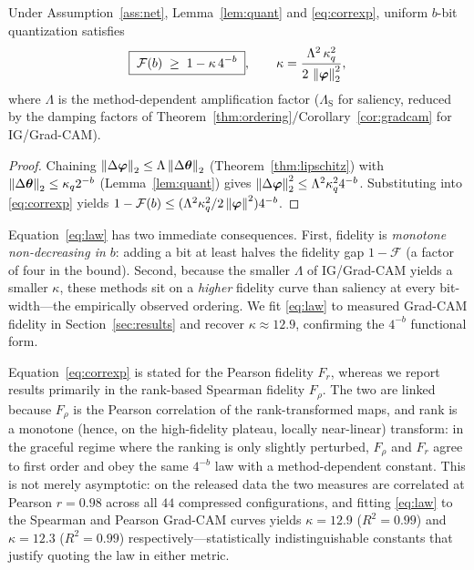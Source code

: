 \begin{theorem}
\label{thm:law}
Under Assumption~\ref{ass:net}, Lemma~\ref{lem:quant} and \eqref{eq:correxp},
uniform $b$-bit quantization satisfies
\begin{equation}
\boxed{\;\mathcal F(b)\;\ge\;1-\kappa\,4^{-b}\;},\qquad
\kappa=\frac{\Lambda^2\,\kappa_q^2}{2\,\left\lVert\bm{\varphi}\right\rVert_2^2},
\label{eq:law}
\end{equation}
where $\Lambda$ is the method-dependent amplification factor
($\Lambda_{\mathrm S}$ for saliency, reduced by the damping factors of
Theorem~\ref{thm:ordering}/Corollary~\ref{cor:gradcam} for IG/Grad-CAM).
\end{theorem}

\begin{proof}
Chaining $\left\lVert\Delta\bm{\varphi}\right\rVert_2\le\Lambda\left\lVert\Delta\bm{\theta}\right\rVert_2$
(Theorem~\ref{thm:lipschitz}) with $\left\lVert\Delta\bm{\theta}\right\rVert_2\le\kappa_q 2^{-b}$
(Lemma~\ref{lem:quant}) gives $\left\lVert\Delta\bm{\varphi}\right\rVert_2^2\le\Lambda^2\kappa_q^2
4^{-b}$. Substituting into \eqref{eq:correxp} yields $1-\mathcal F(b)\le
(\Lambda^2\kappa_q^2/2\left\lVert\bm{\varphi}\right\rVert^2)4^{-b}$.
\end{proof}

Equation~\eqref{eq:law} has two immediate consequences. First, fidelity is
\emph{monotone non-decreasing in $b$}: adding a bit at least halves the fidelity
gap $1-\mathcal F$ (a factor of four in the bound). Second, because the smaller
$\Lambda$ of IG/Grad-CAM yields a smaller $\kappa$, these methods sit on a
\emph{higher} fidelity curve than saliency at every bit-width---the empirically
observed ordering. We fit \eqref{eq:law} to measured Grad-CAM fidelity in
Section~\ref{sec:results} and recover $\kappa\approx 12.9$, confirming the
$4^{-b}$ functional form.

\begin{remark}
\label{rem:pearsonspearman}
Equation~\eqref{eq:correxp} is stated for the Pearson fidelity $F_r$, whereas we
report results primarily in the rank-based Spearman fidelity $F_\rho$. The two
are linked because $F_\rho$ is the Pearson correlation of the rank-transformed
maps, and rank is a monotone (hence, on the high-fidelity plateau, locally
near-linear) transform: in the graceful regime where the ranking is only slightly
perturbed, $F_\rho$ and $F_r$ agree to first order and obey the same $4^{-b}$
law with a method-dependent constant. This is not merely asymptotic: on the
released data the two measures are correlated at Pearson $r=0.98$ across all
$44$ compressed configurations, and fitting \eqref{eq:law} to the Spearman and
Pearson Grad-CAM curves yields $\kappa=12.9$ ($R^2=0.99$) and $\kappa=12.3$
($R^2=0.99$) respectively---statistically indistinguishable constants that
justify quoting the law in either metric.
\end{remark}

